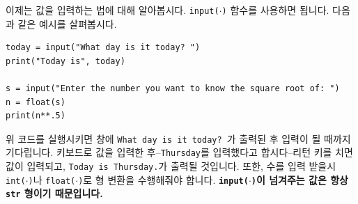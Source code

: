 \documentclass[../main.tex]{subfiles}
\begin{document}
이제는 값을 입력하는 법에 대해 알아봅시다.
\texttt{input($\cdot$)} 함수를 사용하면 됩니다.
다음과 같은 예시를 살펴봅시다.
\begin{verbatim}
today = input("What day is it today? ")
print("Today is", today)

s = input("Enter the number you want to know the square root of: ")
n = float(s)
print(n**.5)
\end{verbatim}
위 코드를 실행시키면 창에 \texttt{What day is it today? }가 출력된 후 입력이 될 때까지 기다립니다.
키보드로 값을 입력한 후--\texttt{Thursday}를 입력했다고 합시다--리턴 키를 치면 값이 입력되고, \texttt{Today is Thursday.}가 출력될 것입니다.
또한, 수를 입력 받을시 \texttt{int($\cdot$)}나 \texttt{float($\cdot$)}로 형 변환을 수행해줘야 합니다.
\textbf{\texttt{input($\cdot$)}이 넘겨주는 값은 항상 \texttt{str} 형이기 때문입니다.}
\end{document}
